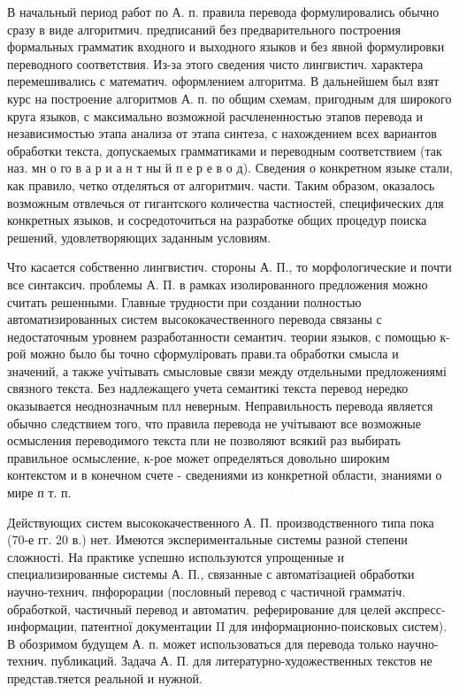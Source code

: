 \documentclass[10pt]{article}
\begin{document}
В начальный период работ по А. п. правила перевода формулировались обычно сразу в виде алгоритмич. предписаний без предварительного построения формальных грамматик входного и выходного языков и без явной формулировки переводного соответствия. Из-за этого сведения чисто лингвистич. характера перемешивались с математич. оформлением алгоритма. В дальнейшем был взят курс на построение алгоритмов А. п. по общим схемам, пригодным для широкого круга языков, с максимально возможной расчлененностью этапов перевода и независимостью этапа анализа от этапа синтеза, с нахождением всех вариантов обработки текста, допускаемых грамматиками и переводным соответствием (так наз. мн о го в а р и а н т ны й п е р е в о д). Сведения о конкретном языке стали, как правило, четко отделяться от алгоритмич. части. Таким образом, оказалось возможным отвлечься от гигантского количества частностей, специфических для конкретных языков, и сосредоточиться на разработке общих процедур поиска решений, удовлетворяющих заданным условиям.



Что касается собственно лингвистич. стороны А. П., то морфологические и почти все синтаксич. проблемы А. П. в рамках изолированного предложения можно считать решенными. Главные трудности при создании полностью автоматизированных систем высококачественного перевода связаны с недостаточным уровнем разработанности семантич. теории языков, с помощью к-рой можно было бы точно сформуліровать прави.та обработки смысла и значений, а также учітывать смысловые связи между отдельными предложениямі связного текста. Без надлежащего учета семантикі текста перевод нередко оказывается неоднозначным плл неверным. Неправильность перевода является обычно следствием того, что правила перевода не учітывают все возможные осмысления переводимого текста пли не позволяют всякий раз выбирать правильное осмысление, к-рое может определяться довольно широким контекстом и в конечном счете - сведениями из конкретной области, знаниями о мире п т. п.



Действующих систем высококачественного А. П. производственного типа пока (70-е гг. 20 в.) нет. Имеются экспериментальные системы разной степени сложності. На практике успешно используются упрощенные и специализированные системы А. П., связанные с автоматізацией обработки научно-технич. пнфорорации (пословный перевод с частичной грамматіч. обработкой, частичный перевод и автоматич. реферирование для целей әкспресс-информации, патентної документации II для информационно-поисковых систем). В обозримом будущем А. п. может использоваться для перевода только научно-технич. публикаций. Задача А. П. для литературно-художественных текстов не представ.тяется реальной и нужной.
\end{document}
